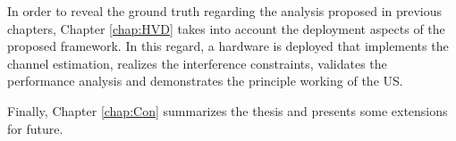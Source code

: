  
In order to reveal the ground truth regarding the analysis proposed in previous chapters, Chapter \ref{chap:HVD} takes into account the deployment aspects of the proposed framework. In this regard, a hardware is deployed that implements the channel estimation, realizes the interference constraints, validates the performance analysis and demonstrates the principle working of the US.   

Finally, Chapter \ref{chap:Con} summarizes the thesis and presents some extensions for future. 
